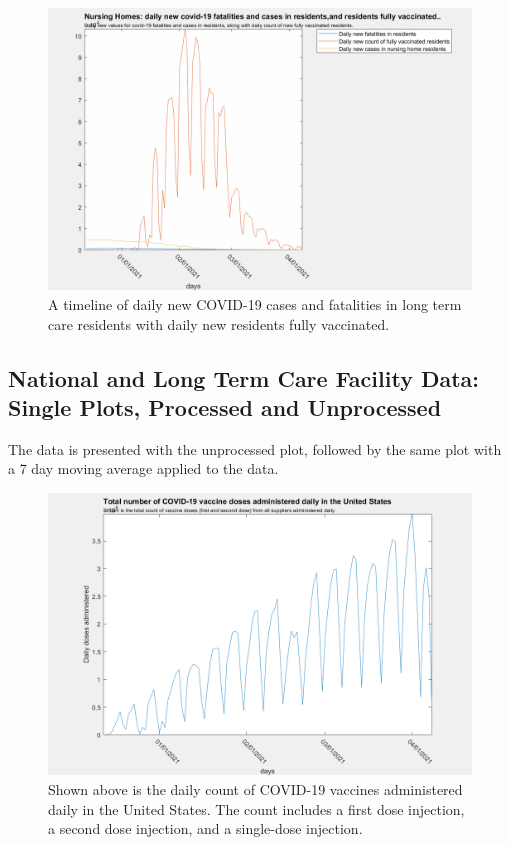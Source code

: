 \documentclass[twoside]{article}
\begin{document}
\begin{multicols}{2}
\begin{figure}[H]
	\includegraphics[width=\linewidth]{images/ltc_daily_cases.png}
	\caption{A timeline of daily new COVID-19 cases and fatalities in long term care residents with daily new residents fully vaccinated.}
	\label{fig:images/ltc_daily_casesLabel}
\end{figure}

\subsection{National and Long Term Care Facility Data: Single Plots, Processed and Unprocessed}

The data is presented with the unprocessed plot, followed by the same plot with a 7 day moving average applied to the data. 

\begin{figure}[H]
	\includegraphics[width=\linewidth]{images/usa_daily_total_doses_unprocessed.png}
	\caption{Shown above is the daily count of COVID-19 vaccines administered daily in the United States. The count includes a first dose injection, a second dose injection, and a single-dose injection.}
	\label{fig:images/usa_daily_total_doses_unprocessedLabel}
\end{figure}


\end{multicols}
\end{document}
